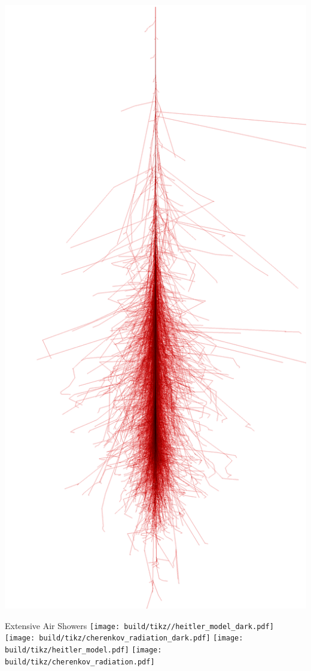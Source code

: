 \begin{frame}
    \includegraphics[height=0.5\textwidth]{graphics/photon100.png}
\end{frame}

\begin{frame}{Extensive Air Showers}
    {%
    \texttt{[image: build/tikz//heitler\_model\_dark.pdf]}
    \texttt{[image: build/tikz/cherenkov\_radiation\_dark.pdf]}
    }
    {%
    \texttt{[image: build/tikz/heitler\_model.pdf]}
    \texttt{[image: build/tikz/cherenkov\_radiation.pdf]}
    }
\end{frame}

